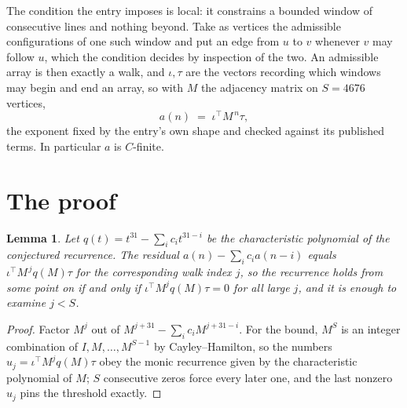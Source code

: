 \documentclass[11pt,a4paper]{article}
\theoremstyle{plain}
\newtheorem{lemma}[theorem]{Lemma}
\theoremstyle{definition}
\begin{document}
The condition the entry imposes is local: it constrains a bounded window of consecutive lines and nothing beyond. Take as vertices the admissible configurations of one such window and put an edge from $u$ to $v$ whenever $v$ may follow $u$, which the condition decides by inspection of the two.
An admissible array is then exactly a walk, and $\iota,\tau$ are the vectors recording which windows may begin and end an array, so with $M$ the adjacency matrix on $S=4676$ vertices,
\[
a(n)\;=\;\iota^{\!\top}M^{\,n}\tau ,
\]
the exponent fixed by the entry's own shape and checked against its published terms. In
particular $a$ is $C$-finite.

\section{The proof}

\begin{lemma}\label{lem:crit}
Let $q(t)=t^{31}-\sum_i c_it^{31-i}$ be the characteristic polynomial of the
conjectured recurrence. The residual $a(n)-\sum_ic_ia(n-i)$ equals
$\iota^{\!\top}M^{\,j}q(M)\tau$ for the corresponding walk index $j$, so the recurrence
holds from some point on if and only if $\iota^{\!\top}M^{j}q(M)\tau=0$ for all large $j$,
and it is enough to examine $j<S$.
\end{lemma}

\begin{proof}
Factor $M^{j}$ out of $M^{j+31}-\sum_ic_iM^{j+31-i}$. For the bound, $M^{S}$
is an integer combination of $I,M,\dots,M^{S-1}$ by Cayley--Hamilton, so the numbers
$u_j=\iota^{\!\top}M^{j}q(M)\tau$ obey the monic recurrence given by the characteristic
polynomial of $M$; $S$ consecutive zeros force every later one, and the last nonzero $u_j$
pins the threshold exactly.
\end{proof}
\end{document}
